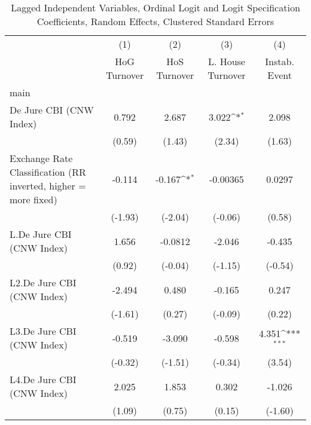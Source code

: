 {
\def\sym#1{\ifmmode^{#1}\else\(^{#1}\)\fi}
\begin{longtable}{l*{4}{c}}
\caption{Lagged Independent Variables, Ordinal Logit and Logit Specification Coefficients, Random Effects, Clustered Standard Errors \label{lagordLogLogDJ}}\\
\hline\hline\endfirsthead\hline\endhead\hline\endfoot\endlastfoot
                &\multicolumn{1}{c}{(1)}&\multicolumn{1}{c}{(2)}&\multicolumn{1}{c}{(3)}&\multicolumn{1}{c}{(4)}\\
                &\multicolumn{1}{c}{HoG Turnover}&\multicolumn{1}{c}{HoS Turnover}&\multicolumn{1}{c}{L. House Turnover}&\multicolumn{1}{c}{Instab. Event}\\
\hline
main            &                  &                  &                  &                  \\
De Jure CBI (CNW Index)&    0.792         &    2.687         &    3.022\sym{*}  &    2.098         \\
                &   (0.59)         &   (1.43)         &   (2.34)         &   (1.63)         \\
[1em]
Exchange Rate Classification (RR inverted, higher = more fixed)&   -0.114         &   -0.167\sym{*}  & -0.00365         &   0.0297         \\
                &  (-1.93)         &  (-2.04)         &  (-0.06)         &   (0.58)         \\
[1em]
L.De Jure CBI (CNW Index)&    1.656         &  -0.0812         &   -2.046         &   -0.435         \\
                &   (0.92)         &  (-0.04)         &  (-1.15)         &  (-0.54)         \\
[1em]
L2.De Jure CBI (CNW Index)&   -2.494         &    0.480         &   -0.165         &    0.247         \\
                &  (-1.61)         &   (0.27)         &  (-0.09)         &   (0.22)         \\
[1em]
L3.De Jure CBI (CNW Index)&   -0.519         &   -3.090         &   -0.598         &    4.351\sym{***}\\
                &  (-0.32)         &  (-1.51)         &  (-0.34)         &   (3.54)         \\
[1em]
L4.De Jure CBI (CNW Index)&    2.025         &    1.853         &    0.302         &   -1.026         \\
                &   (1.09)         &   (0.75)         &   (0.15)         &  (-1.60)         \\

\end{longtable}}
